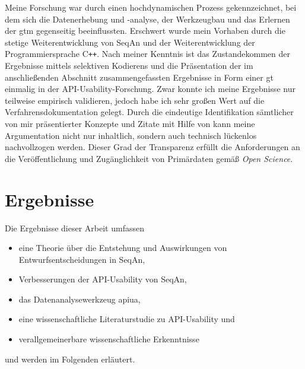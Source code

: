 Meine Forschung war durch einen hochdynamischen Prozess gekennzeichnet, bei dem sich die Datenerhebung und -analyse, der Werkzeugbau und das Erlernen der \gls{gtm} gegenseitig beeinflussten. Erschwert wurde mein Vorhaben durch die stetige Weiterentwicklung von SeqAn und der Weiterentwicklung der Programmiersprache C\texttt{++}. Nach meiner Kenntnis ist das Zustandekommen der Ergebnisse mittels selektiven Kodierens und die Präsentation der im anschließenden Abschnitt zusammengefassten Ergebnisse in Form einer \gls{gt} einmalig in der API-Usability-Forschung. Zwar konnte ich meine Ergebnisse nur teilweise empirisch validieren, jedoch habe ich sehr großen Wert auf die Verfahrensdokumentation gelegt. Durch die eindeutige Identifikation sämtlicher von mir präsentierter Konzepte und Zitate mit Hilfe von  kann meine Argumentation nicht nur inhaltlich, sondern auch technisch lückenlos nachvollzogen werden. Dieser Grad der Transparenz erfüllt die Anforderungen an die Veröffentlichung und Zugänglichkeit von Primärdaten gemäß \textit{Open Science}.






\section{Ergebnisse}
Die Ergebnisse dieser Arbeit umfassen
\begin{itemize}
\itemsep1pt\parskip0pt
  \item eine Theorie über die Entstehung und Auswirkungen von Entwurfsentscheidungen in SeqAn,
  \item Verbesserungen der API-Usability von SeqAn,
  \item das Datenanalysewerkzeug \acrlong{apiua},
  \item eine wissenschaftliche Literaturstudie zu API-Usability und
  \item verallgemeinerbare wissenschaftliche Erkenntnisse
\end{itemize}

und werden im Folgenden erläutert.

